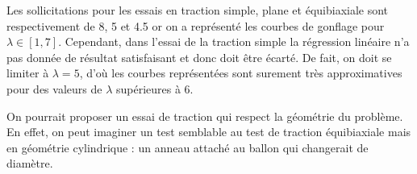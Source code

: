 \documentclass[a4paper,11pt]{article}
\begin{document}
Les sollicitations pour les essais en traction simple, plane et équibiaxiale sont respectivement de 8, 5 et 4.5 or on a représenté les courbes de gonflage pour $\lambda \in [1, 7]$. Cependant, dans l'essai de la traction simple la régression linéaire n'a pas donnée de résultat satisfaisant et donc doit être écarté. De fait, on doit se limiter à $\lambda = 5$, d'où les courbes représentées sont surement très approximatives pour des valeurs de $\lambda$ supérieures à 6.

On pourrait proposer un essai de traction qui respect la géométrie du problème. En effet, on peut imaginer un test semblable au test de traction équibiaxiale mais en géométrie cylindrique : un anneau attaché au ballon qui changerait de diamètre.




\end{document}
